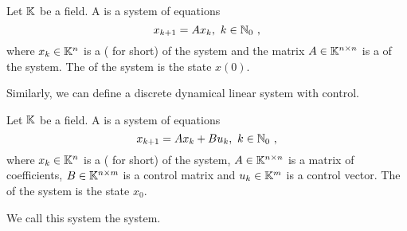 \begin{definition}
	Let $\mathbb{K}$ be a field. A  is a system of equations
	$$x_{k+1}=Ax_k,\ k\in\N_0\ ,$$
	where $x_k\in \mathbb{K}^n$ is a  ( for short) of the system and the matrix $A\in \mathbb{K}^{n\times n}$ is a  of the system. The  of the system is the state $x(0)$.
\end{definition}

Similarly, we can define a discrete dynamical linear system with control.

\begin{definition}
	Let $\mathbb{K}$ be a field. A  is a system of equations
	$$x_{k+1}=Ax_k+Bu_k,\ k\in\N_0\ ,$$
	where $x_k\in\mathbb{K}^n$ is a  ( for short) of the system, $A\in\mathbb{K}^{n\times n}$ is a matrix of coefficients, $B\in\mathbb{K}^{n\times m}$ is a control matrix and $u_k\in\mathbb{K}^m$ is a control vector. The  of the system is the state $x_0$.

	We call this system the  system.
\end{definition}